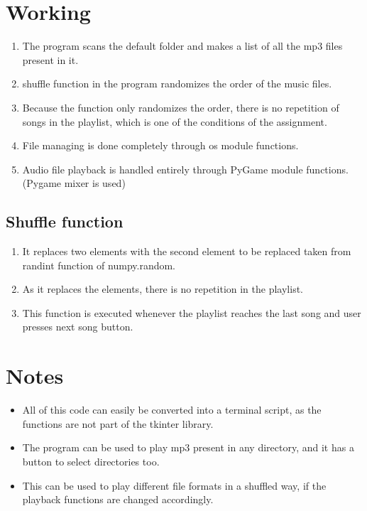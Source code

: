 \documentclass{article}
\begin{document}
\section{Working}
\begin{enumerate}
    \item The program scans the default folder and makes a list of all the mp3 files present in it.
    \item shuffle function in the program randomizes the order of the music files.
    \item Because the function only randomizes the order, there is no repetition of songs in the playlist, which is one of the conditions of the assignment.
    \item File managing is done completely through os module functions.
    \item Audio file playback is handled entirely through PyGame module functions. (Pygame mixer is used)
\end{enumerate}
\subsection*{Shuffle function}
\begin{enumerate}
    \item It replaces two elements with the second element to be replaced taken from randint function of numpy.random.
    \item As it replaces the elements, there is no repetition in the playlist.
    \item This function is executed whenever the playlist reaches the last song and user presses next song button.
\end{enumerate}

\section{Notes}
\begin{itemize}
    \item All of this code can easily be converted into a terminal script, as the functions are not part of the tkinter library.
    \item The program can be used to play mp3 present in any directory, and it has a button to select directories too.
    \item This can be used to play different file formats in a shuffled way, if the playback functions are changed accordingly.
\end{itemize}

 
\end{document}
